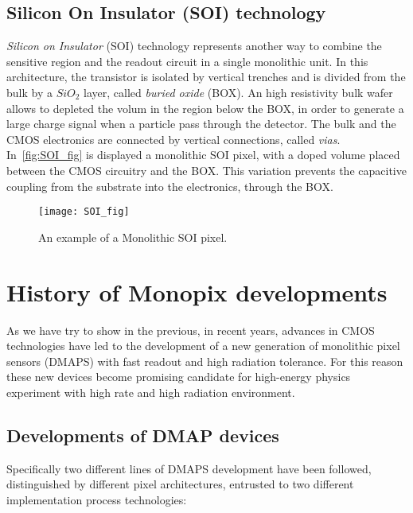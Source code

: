 \subsection{Silicon On Insulator (SOI) technology}

\textit{Silicon on Insulator} (SOI) technology represents another way to combine the sensitive region and the readout circuit in a single monolithic unit. In this architecture, the transistor is isolated by vertical trenches and is divided from the bulk by a $SiO_{2}$ layer, called \emph{buried oxide} (BOX).
An high resistivity bulk wafer allows to depleted the volum in the region below the BOX, in order to generate a large charge signal when a particle pass through the detector. The bulk and the CMOS electronics are connected by vertical connections, called \textit{vias}. \\
In~\autoref{fig:SOI_fig} is displayed a monolithic SOI pixel, with a doped volume placed between the CMOS circuitry and the BOX. This variation prevents the capacitive coupling from the substrate into the electronics, through the BOX.

\begin{figure}[h!]
\centering
\texttt{[image: SOI\_fig]}
\caption{An example of a Monolithic SOI pixel.}
\label{fig:SOI_fig}
\end{figure}


\section{History of Monopix developments}

As we have try to show in the previous, in recent years, advances in CMOS technologies have led to the development of a new generation of monolithic pixel sensors (DMAPS) with fast readout and high radiation tolerance. For this reason these new devices become promising candidate for high-energy physics experiment with high rate and high radiation environment.


\subsection{Developments of DMAP devices}

Specifically two different lines of DMAPS development have been followed, distinguished by different pixel architectures, entrusted to two different implementation process technologies:

